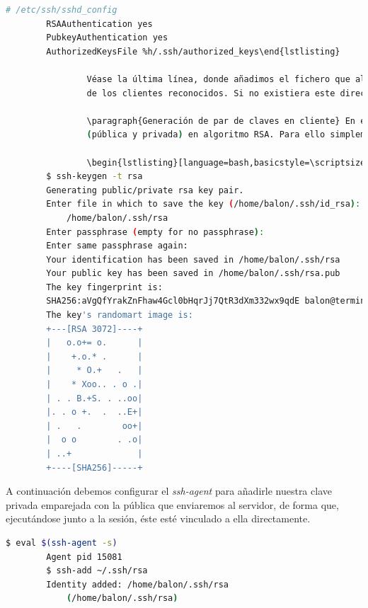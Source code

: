 \documentclass[a4paper, 11pt, titlepage]{book}
\begin{document}
                \begin{lstlisting}[language=bash]
        # /etc/ssh/sshd_config
        RSAAuthentication yes
        PubkeyAuthentication yes
        AuthorizedKeysFile %h/.ssh/authorized_keys\end{lstlisting}
    
                Véase la última línea, donde añadimos el fichero que almacenará las claves públicas 
                de los clientes reconocidos. Si no existiera este directorio y/o fichero deberemos crearlo.
            
                \paragraph{Generación de par de claves en cliente} En el cliente crearemos el par de claves 
                (pública y privada) en algoritmo RSA. Para ello simplemente usaremos 
    
                \begin{lstlisting}[language=bash,basicstyle=\scriptsize]
        $ ssh-keygen -t rsa
        Generating public/private rsa key pair.
        Enter file in which to save the key (/home/balon/.ssh/id_rsa): 
            /home/balon/.ssh/rsa
        Enter passphrase (empty for no passphrase): 
        Enter same passphrase again: 
        Your identification has been saved in /home/balon/.ssh/rsa
        Your public key has been saved in /home/balon/.ssh/rsa.pub
        The key fingerprint is:
        SHA256:aVgQfYrakZnFhaw4Gcl0bHqrJj7QtR3dXm332wx9qdE balon@terminator
        The key's randomart image is:
        +---[RSA 3072]----+
        |   o.o+= o.      |
        |    +.o.* .      |
        |     * O.+   .   |
        |    * Xoo.. . o .|
        | . . B.+S. . ..oo|
        |. . o +.  .  ..E+|
        | .   .        oo+|
        |  o o        . .o|
        | ..+             |
        +----[SHA256]-----+\end{lstlisting}
    
                A continuación debemos configurar el \textit{ssh-agent} para añadirle nuestra 
                clave privada emparejada con la pública que enviaremos al servidor, de forma que,
                ejecutándose junto a la sesión, éste esté vinculado a ella directamente.
    
                \begin{lstlisting}[language=bash,basicstyle=\small]
        $ eval $(ssh-agent -s)
        Agent pid 15081
        $ ssh-add ~/.ssh/rsa
        Identity added: /home/balon/.ssh/rsa 
            (/home/balon/.ssh/rsa) \end{lstlisting}
    
\end{document}

